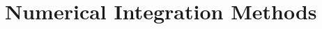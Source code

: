 \documentclass{article}
\begin{document}
\newcommand{\vecthreeBF}[1]{\vec{\textbf{#1}}}
\newcommand{\vecthree}[1]{\vec{#1}}

\newcommand{\parDeriv}[2]{\frac{\partial #1}{\partial #2}}
\newcommand{\parDerivS}[2]{\frac{\partial^2 #1}{\partial #2^2}}
\newcommand{\derivS}[2]{\frac{d^2 #1}{d#2^2}}

\newcommand{\dotProdBF}[2]{\vecthreeBF{#1} \cdot \vecthreeBF{#2}}
\newcommand{\dotProd}[2]{\vecthree{#1} \cdot \vecthree{#2}}

\newcommand{\crossProdBF}[2]{\vecthreeBF{#1} \times \vecthreeBF{#2}}
\newcommand{\crossProd}[2]{\vecthree{#1} \times \vecthree{#2}}


\newcommand{\fromeq}[1]{\textit{equation \ref{eq:#1}}}
\newcommand{\fromeqs}[2]{\textit{equations \ref{eq:#1} and \ref{eq:#2}}}

\newcommand{\fromfig}[1]{\textit{figure \ref{fig:#1}}}



\section{Numerical Integration Methods}
\end{document}
